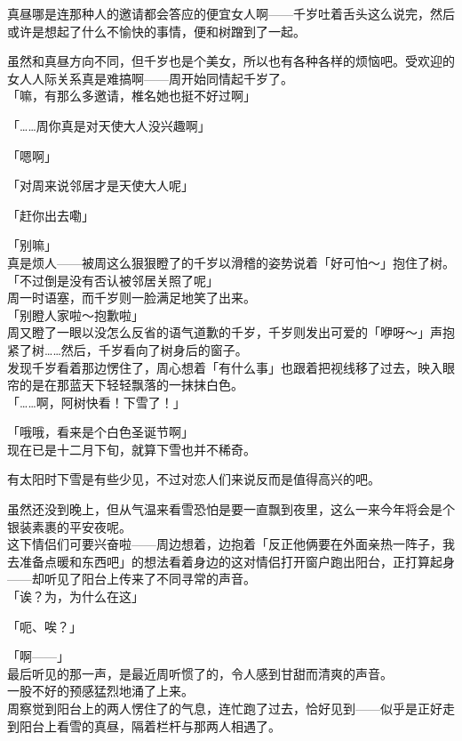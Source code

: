 真昼哪是连那种人的邀请都会答应的便宜女人啊——千岁吐着舌头这么说完，然后或许是想起了什么不愉快的事情，便和树蹭到了一起。

虽然和真昼方向不同，但千岁也是个美女，所以也有各种各样的烦恼吧。受欢迎的女人人际关系真是难搞啊——周开始同情起千岁了。\\

「嘛，有那么多邀请，椎名她也挺不好过啊」

「……周你真是对天使大人没兴趣啊」

「嗯啊」

「对周来说邻居才是天使大人呢」

「赶你出去嘞」

「别嘛」\\

真是烦人——被周这么狠狠瞪了的千岁以滑稽的姿势说着「好可怕～」抱住了树。\\

「不过倒是没有否认被邻居关照了呢」\\

周一时语塞，而千岁则一脸满足地笑了出来。\\

「别瞪人家啦～抱歉啦」\\

周又瞪了一眼以没怎么反省的语气道歉的千岁，千岁则发出可爱的「咿呀～」声抱紧了树……然后，千岁看向了树身后的窗子。\\

发现千岁看着那边愣住了，周心想着「有什么事」也跟着把视线移了过去，映入眼帘的是在那蓝天下轻轻飘落的一抹抹白色。\\

「……啊，阿树快看！下雪了！」

「哦哦，看来是个白色圣诞节啊」\\

现在已是十二月下旬，就算下雪也并不稀奇。

有太阳时下雪是有些少见，不过对恋人们来说反而是值得高兴的吧。

虽然还没到晚上，但从气温来看雪恐怕是要一直飘到夜里，这么一来今年将会是个银装素裹的平安夜呢。\\

这下情侣们可要兴奋啦——周边想着，边抱着「反正他俩要在外面亲热一阵子，我去准备点暖和东西吧」的想法看着身边的这对情侣打开窗户跑出阳台，正打算起身——却听见了阳台上传来了不同寻常的声音。\\

「诶？为，为什么在这」

「呃、唉？」

「啊——」\\

最后听见的那一声，是最近周听惯了的，令人感到甘甜而清爽的声音。\\

一股不好的预感猛烈地涌了上来。\\

周察觉到阳台上的两人愣住了的气息，连忙跑了过去，恰好见到——似乎是正好走到阳台上看雪的真昼，隔着栏杆与那两人相遇了。

